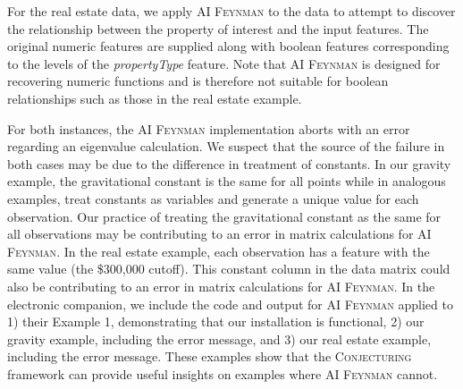 \documentclass[ijds,nonblindrev]{informs-ijds}
\begin{document}
For the real estate data, we apply \textsc{AI Feynman} to the data to attempt to discover the relationship between the property of interest and the input features.  The original  numeric features are supplied along with boolean features corresponding to the levels of the \textit{propertyType} feature.  Note that \textsc{AI Feynman} is designed for recovering numeric functions and is therefore not suitable for boolean relationships such as those in the real estate example.  

For both instances, the \textsc{AI Feynman} implementation aborts with an error regarding an eigenvalue calculation.  We suspect that the source of the failure in both cases may be due to the difference in treatment of constants.  In our gravity example, the gravitational constant is the same for all points while in analogous examples, \cite{UdrescuTegmark20} treat constants as variables and generate a unique value for each observation.  Our practice of treating the gravitational constant as the same for all observations may be contributing to an error in matrix calculations for \textsc{AI Feynman}.  In the real estate example, each observation has a feature with the same value (the \$300,000 cutoff).  This constant column in the data matrix could also be contributing to an error in matrix calculations for \textsc{AI Feynman}.  In the electronic companion, we include the code and output for \textsc{AI Feynman} applied to 1) their Example 1, demonstrating that our installation is functional, 2) our gravity example, including the error message, and 3) our real estate example, including the error message.  These examples show that the \textsc{Conjecturing} framework can provide useful insights on examples where \textsc{AI Feynman} cannot.   
\end{document}
